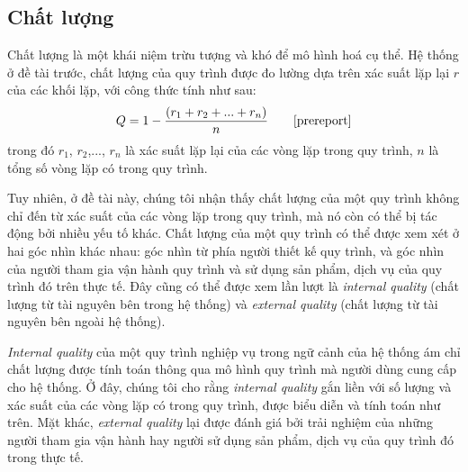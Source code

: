 \subsection{Chất lượng}
Chất lượng là một khái niệm trừu tượng và khó để mô hình hoá cụ thể. Hệ thống ở đề tài trước, chất lượng của quy trình được đo lường dựa trên xác suất lặp lại $r$ của các khối lặp, với công thức tính như sau:
\[ Q = 1 - \frac{(r_1 + r_2 + ... + r_n)}{n} \tag*{\cite{prereport}}\]
trong đó $r_1$, $r_2$,..., $r_n$ là xác suất lặp lại của các vòng lặp trong quy trình, $n$ là tổng số vòng lặp có trong quy trình.
\par
Tuy nhiên, ở đề tài này, chúng tôi nhận thấy chất lượng của một quy trình không chỉ đến từ xác suất của các vòng lặp trong quy trình, mà nó còn có thể bị tác động bởi nhiều yếu tố khác. Chất lượng của một quy trình có thể được xem xét ở hai góc nhìn khác nhau: góc nhìn từ phía người thiết kế quy trình, và góc nhìn của người tham gia vận hành quy trình và sử dụng sản phẩm, dịch vụ của quy trình đó trên thực tế. Đây cũng có thể được xem lần lượt là \emph{internal quality} (chất lượng từ tài nguyên bên trong hệ thống) và \emph{external quality} (chất lượng từ tài nguyên bên ngoài hệ thống).
\par
\emph{Internal quality} của một quy trình nghiệp vụ trong ngữ cảnh của hệ thống ám chỉ chất lượng được tính toán thông qua mô hình quy trình mà người dùng cung cấp cho hệ thống. Ở đây, chúng tôi cho rằng \emph{internal quality} gắn liền với số lượng và xác suất của các vòng lặp có trong quy trình, được biểu diễn và tính toán như trên. Mặt khác, \emph{external quality} lại được đánh giá bởi trải nghiệm của những người tham gia vận hành hay người sử dụng sản phẩm, dịch vụ của quy trình đó trong thực tế.